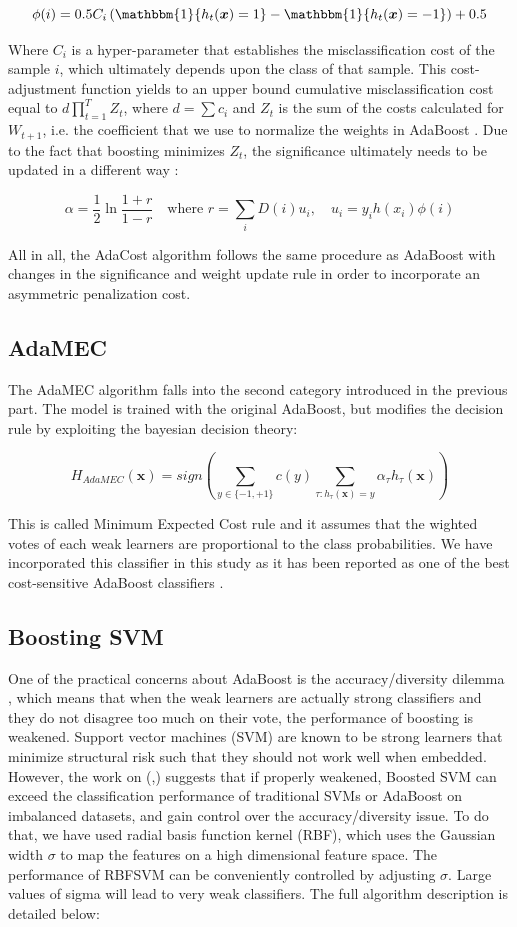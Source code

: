 \documentclass[conference]{IEEEtran}
\begin{document}
$$\phi(i) = 0.5C_i \left( \mathbbm{1}\{ h_t(\boldsymbol x)=1\} -  \mathbbm{1}\{ h_t(\boldsymbol x)=-1\} \right)+0.5$$

Where $C_i$ is a hyper-parameter that establishes the misclassification cost of the sample $i$, which ultimately depends upon the class of that sample. This cost-adjustment function yields to an upper bound cumulative misclassification cost equal to $d\prod_{t=1}^TZ_t$, where $d= \sum c_i$ and $Z_t$ is the sum of the costs calculated for $W_{t+1}$, i.e. the coefficient that we use to normalize the weights in AdaBoost \cite{adacost}. Due to the fact that boosting minimizes $Z_t$, the significance ultimately needs to be updated in a different way \cite{improved_boosting}:

$$ \alpha = \frac{1}{2}\ln\frac{1+r}{1-r}\quad \text{where } r=\sum_iD(i)u_i, \quad u_i=y_i h(x_i)\phi(i)$$

All in all, the AdaCost algorithm follows the same procedure as AdaBoost with changes in the significance and weight update rule in order to incorporate an asymmetric penalization cost. 

\subsection{AdaMEC}
The AdaMEC algorithm falls into the second category introduced in the previous part. The model is trained with the original AdaBoost, but modifies the decision rule by exploiting the bayesian decision theory:

$$ H_{AdaMEC}(\boldsymbol x) = sign \left( \sum_{y \in \{-1,+1\}} c(y) \sum_{\tau: h_{\tau}(\boldsymbol x)=y} \alpha_{\tau} h_{\tau}(\boldsymbol x)\right)$$

This is called Minimum Expected Cost rule and it assumes that the wighted votes of each weak learners are proportional to the class probabilities. We have incorporated this classifier in this study as it has been reported as one of the best cost-sensitive AdaBoost classifiers \cite{need_boosting}.


\subsection{Boosting SVM}
One of the practical concerns about AdaBoost is the accuracy/diversity dilemma \cite{study_boosted_svm}, which means that when the weak learners are actually strong classifiers and they do not disagree too much on their vote, the performance of boosting is weakened. Support vector machines (SVM) are known to be strong learners that minimize structural risk such that they should not work well when embedded. However, the work on (\cite{study_boosted_svm},\cite{boosting_svm}) suggests that if properly weakened, Boosted SVM can exceed the classification performance of traditional SVMs or AdaBoost on imbalanced datasets, and gain control over the accuracy/diversity issue. To do that, we have used radial basis function kernel (RBF), which uses the Gaussian width $\sigma$ to map the features on a high dimensional feature space. The performance of RBFSVM can be conveniently controlled by adjusting $\sigma$. Large values of sigma will lead to very weak classifiers. The full algorithm description is detailed below:
\end{document}
